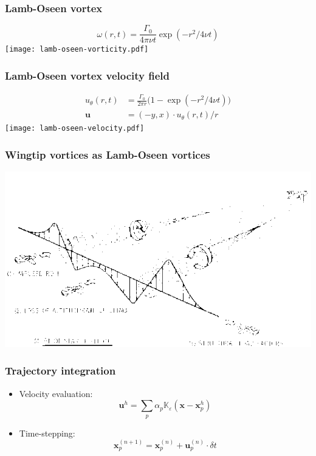 \documentclass[12pt,english]{beamer}
\newcommand{\K}{\mathbb{K}}  %
\renewcommand{\vec}{\mathbf}
\newcommand{\x}{\vec x}      %
\newcommand{\vel}{\vec u}    %
\begin{document}
  \begin{frame}
    \frametitle{Lamb-Oseen vortex}
    \begin{equation}
      ω(r, t) = \frac{Γ_0}{4πνt} \exp(-r^2/4νt)
    \end{equation}
    \texttt{[image: lamb-oseen-vorticity.pdf]}
  \end{frame}

  \begin{frame}
    \frametitle{Lamb-Oseen vortex velocity field}
    \begin{align}
      u_\theta(r, t) &= \frac{Γ_0}{2πr} \bigl(1 - \exp(-r^2/4νt)\bigr) \\
      \vec{u} &= (-y, x)\cdot u_\theta(r, t)/r
    \end{align}
    \texttt{[image: lamb-oseen-velocity.pdf]}
  \end{frame}

  \begin{frame}
    \frametitle{Wingtip vortices as Lamb-Oseen vortices}
    \includegraphics[scale=.45]{wingtip-vortices.png}
  \end{frame}

  \begin{frame}
    \frametitle{Trajectory integration}
    \begin{itemize}
      \item Velocity evaluation:
        \begin{equation}
          \vel^h = \sum_p α_p \K_ε(\x - \x^h_p)
        \end{equation}
      \item Time-stepping:
        \begin{equation}
          \x_p^{(n + 1)} = \x_p^{(n)} + \vel_p^{(n)}\cdot δt
        \end{equation}
    \end{itemize}
  \end{frame}
\end{document}
